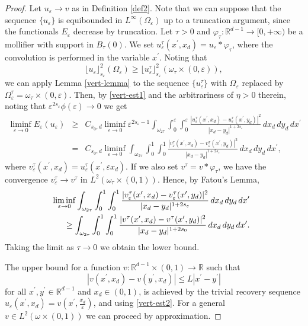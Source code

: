 \documentclass[11pt]{article}
\def\e{\varepsilon}
\begin{document}
\begin{proof}
Let $u_\e\to v$ as in Definition \ref{def2}. 
Note that we can suppose that the sequence $\{u_\e\}$ is equibounded in $L^\infty(\Omega_\e)$ up to a truncation argument, since the functionals $E_\e$ decrease by truncation. 
Let $\tau>0$ and $\varphi_\tau\colon\mathbb R^{d-1}\to [0,+\infty)$ be a mollifier with support in $B_\tau(0)$. 
We set $u_\e^\tau(x^\prime,x_d)=u_\e \ast\varphi_\tau$, where the convolution is performed in the variable $x^\prime$. Noting that 
$$\lfloor u_\e\rfloor_{s_\e}^2(\Omega_\e)\geq \lfloor u_\e^\tau\rfloor_{s_\e}^2(\omega_\tau\times(0,\e)),$$ 
we can apply Lemma \ref{vert-lemma} to the sequence $\{u_\e^\tau\}$ with $\Omega_\e$ replaced by $\Omega_\e^\tau=\omega_{\tau}\times (0,\e)$. Then, by \eqref{vert-est1} and the arbitrariness of $\eta>0$ therein, noting that $\e^{2s_\e}\phi(\e)\to 0$ we get 
\begin{eqnarray*}
\liminf_{\e\to 0} E_\e(u_\e)&\geq&C_{s_0,d} \liminf_{\e\to 0}\e^{2s_\e-1}\int_{\omega_{2\tau}}\int_0^\e\int_0^\e\frac{|u^\tau_\e(x^\prime, x_d)-u^\tau_\e(x^\prime, y_d)|^2}{|x_d-y_d|^{1+2s_\e}}\, dx_d\, dy_d\, dx^\prime\\
&=&C_{s_0,d} \liminf_{\e\to 0}\int_{\omega_{2\tau}}\int_0^1\int_0^1\frac{|v^\tau_\e(x^\prime, x_d)-v^\tau_\e(x^\prime, y_d)|^2}{|x_d-y_d|^{1+2s_\e}}\, dx_d\, dy_d\, dx^\prime, 
\end{eqnarray*}
where $v^\tau_\e(x^\prime, x_d)=u^\tau_\e(x^\prime, \e x_d)$. 
If we also set $v^\tau=v\ast \varphi_\tau$, we have the convergence $v^\tau_\e\to v^\tau$ in $L^2(\omega_\tau\times (0,1))$. Hence, by Fatou's Lemma, 
\begin{eqnarray*}
&&\hspace{-2cm}\liminf_{\e\to 0}\int_{\omega_{2\tau}}\int_0^1\int_0^1\frac{|v^\tau_\e(x^\prime, x_d)-v^\tau_\e(x^\prime, y_d)|^2}{|x_d-y_d|^{1+2s_\e}}\, dx_d\, dy_d\, dx^\prime\\
&&\geq 
\int_{\omega_{2\tau}}\int_0^1\int_0^1\frac{|v^\tau(x^\prime, x_d)-v^\tau(x^\prime, y_d)|^2}{|x_d-y_d|^{1+2s_0}}\, dx_d\, dy_d\, dx^\prime. 
\end{eqnarray*}
Taking the limit as $\tau\to 0$ we obtain the lower bound. 

The upper bound for a  function $v\colon\mathbb R^{d-1}\times(0,1)\to\mathbb R$ such that  
\begin{equation*}
|v(x^\prime, x_d)-v(y^\prime, x_d)|\leq L|x^\prime-y^\prime|
\end{equation*}
for all $x^\prime,y^\prime\in \mathbb R^{d-1}$ and $x_d\in (0,1)$, is achieved by the trivial recovery sequence $u_\e(x^\prime, x_d)=v(x^\prime, \frac{x_d}{\e})$, and using \eqref{vert-est2}. For a general $v\in L^2(\omega\times (0,1))$ we can proceed by approximation.
\end{proof}
\end{document}
